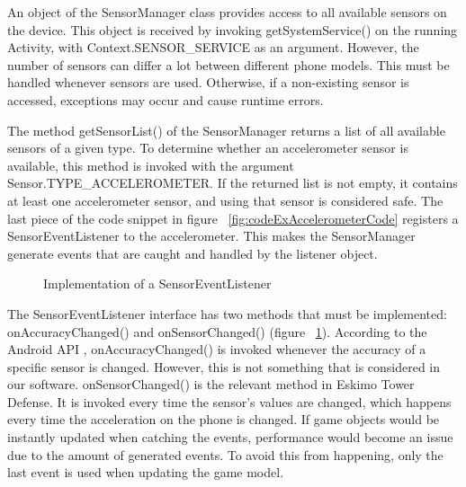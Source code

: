 An object of the SensorManager class provides access to all available sensors on the device. This object is received by invoking getSystemService() on the running Activity, with Context.SENSOR\_SERVICE as an argument. However, the number of sensors can differ a lot between different phone models. This must be handled whenever sensors are used. Otherwise, if a non-existing sensor is accessed, exceptions may occur and cause runtime errors.
 
The method getSensorList() of the SensorManager returns a list of all available sensors of a given type. To determine whether an accelerometer sensor is available, this method is invoked with the argument Sensor.TYPE\_ACCELEROMETER. If the returned list is not empty, it contains at least one accelerometer sensor, and using that sensor is considered safe. The last piece of the code snippet in figure ~\ref{fig:codeExAccelerometerCode} registers a SensorEventListener to the accelerometer. This makes the SensorManager generate events that are caught and handled by the listener object.

\begin{figure}[htb]

\begin{small}

\end{small}

\caption{Implementation of a SensorEventListener}
\label{fig:codeExAccelerometerSensorEvent}

\end{figure}

The SensorEventListener interface has two methods that must be implemented: onAccuracyChanged() and onSensorChanged() (figure ~\ref{fig:codeExAccelerometerSensorEvent}). According to the Android API \citep{Android}, onAccuracyChanged() is invoked whenever the accuracy of a specific sensor is changed. However, this is not something that is considered in our software. onSensorChanged() is the relevant method in Eskimo Tower Defense. It is invoked every time the sensor's values are changed, which happens every time the acceleration on the phone is changed. If game objects would be instantly updated when catching the events, performance would become an issue due to the amount of generated events. To avoid this from happening, only the last event is used when updating the game model.